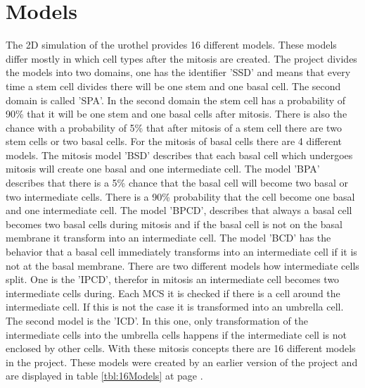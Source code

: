 \section{Models}
The 2D simulation of the urothel provides 16 different models. These models differ mostly in which cell types after the mitosis are created. The project divides the models into two domains, one has the identifier 'SSD' and means that every time a stem cell divides there will be one stem and one basal cell. The second domain is called 'SPA'. In the second domain the stem cell has a probability of 90\% that it will be one stem and one basal cells after mitosis. There is also the chance with a probability of 5\% that after mitosis of a stem cell there are two stem cells or two basal cells. \newline
For the mitosis of basal cells there are 4 different models. The mitosis model 'BSD' describes that each basal cell which undergoes mitosis will create one basal and one intermediate cell. The model 'BPA' describes that there is a 5\% chance that the basal cell will become two basal or two intermediate cells. There is a 90\% probability that the cell become one basal and one intermediate cell. The model 'BPCD', describes that always a basal cell becomes two basal cells during mitosis and if the basal cell is not on the basal membrane it transform into an intermediate cell. The model 'BCD' has the behavior that a basal cell immediately transforms into an intermediate cell if it is not at the basal membrane.\newline
There are two different models how intermediate cells split. One is the 'IPCD', therefor in mitosis an intermediate cell becomes two intermediate cells during. Each \ac{MCS} it is checked if there is a cell around the intermediate cell. If this is not the case it is transformed into an umbrella cell. The second model is the 'ICD'. In this one, only transformation of the intermediate cells into the umbrella cells happens if the intermediate cell is not enclosed by other cells. \newline
With these mitosis concepts there are 16 different models in the project. These models were created by an earlier version of the project \cite{Torelli2017} and are displayed in table \ref{tbl:16Models} at page \pageref{tbl:16Models}.


